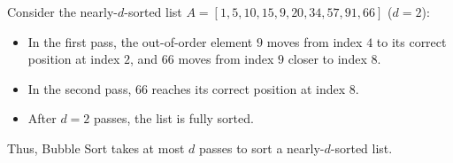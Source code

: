 \documentclass[10pt]{article}
\begin{document}
Consider the nearly-\( d \)-sorted list \( A = [1, 5, 10, 15, 9, 20, 34, 57, 91, 66] \) (\( d = 2 \)):

\begin{itemize}
  \item In the first pass, the out-of-order element \( 9 \) moves from index \( 4 \) to its correct position at index \( 2 \), and \( 66 \) moves from index \( 9 \) closer to index \( 8 \).
  \item In the second pass, \( 66 \) reaches its correct position at index \( 8 \).
  \item After \( d = 2 \) passes, the list is fully sorted.
\end{itemize}

Thus, Bubble Sort takes at most \( d \) passes to sort a nearly-\( d \)-sorted list.
\end{document}
